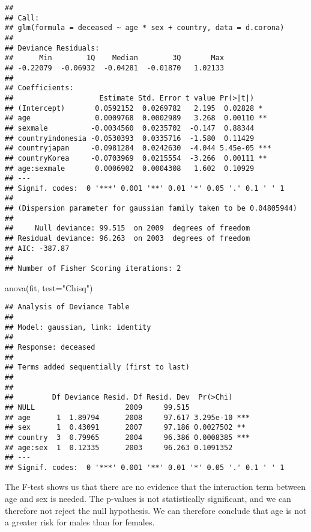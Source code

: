 \documentclass[
]{article}
\newenvironment{Shaded}{\begin{snugshade}}{\end{snugshade}}
\newcommand{\AttributeTok}[1]{\textcolor[rgb]{0.77,0.63,0.00}{#1}}
\newcommand{\FunctionTok}[1]{\textcolor[rgb]{0.00,0.00,0.00}{#1}}
\newcommand{\NormalTok}[1]{#1}
\newcommand{\StringTok}[1]{\textcolor[rgb]{0.31,0.60,0.02}{#1}}
\begin{document}
\begin{verbatim}
## 
## Call:
## glm(formula = deceased ~ age * sex + country, data = d.corona)
## 
## Deviance Residuals: 
##      Min        1Q    Median        3Q       Max  
## -0.22079  -0.06932  -0.04281  -0.01870   1.02133  
## 
## Coefficients:
##                    Estimate Std. Error t value Pr(>|t|)    
## (Intercept)       0.0592152  0.0269782   2.195  0.02828 *  
## age               0.0009768  0.0002989   3.268  0.00110 ** 
## sexmale          -0.0034560  0.0235702  -0.147  0.88344    
## countryindonesia -0.0530393  0.0335716  -1.580  0.11429    
## countryjapan     -0.0981284  0.0242630  -4.044 5.45e-05 ***
## countryKorea     -0.0703969  0.0215554  -3.266  0.00111 ** 
## age:sexmale       0.0006902  0.0004308   1.602  0.10929    
## ---
## Signif. codes:  0 '***' 0.001 '**' 0.01 '*' 0.05 '.' 0.1 ' ' 1
## 
## (Dispersion parameter for gaussian family taken to be 0.04805944)
## 
##     Null deviance: 99.515  on 2009  degrees of freedom
## Residual deviance: 96.263  on 2003  degrees of freedom
## AIC: -387.87
## 
## Number of Fisher Scoring iterations: 2
\end{verbatim}

\begin{Shaded}
\begin{Highlighting}[]
\FunctionTok{anova}\NormalTok{(fit, }\AttributeTok{test=}\StringTok{"Chisq"}\NormalTok{)}
\end{Highlighting}
\end{Shaded}

\begin{verbatim}
## Analysis of Deviance Table
## 
## Model: gaussian, link: identity
## 
## Response: deceased
## 
## Terms added sequentially (first to last)
## 
## 
##         Df Deviance Resid. Df Resid. Dev  Pr(>Chi)    
## NULL                     2009     99.515              
## age      1  1.89794      2008     97.617 3.295e-10 ***
## sex      1  0.43091      2007     97.186 0.0027502 ** 
## country  3  0.79965      2004     96.386 0.0008385 ***
## age:sex  1  0.12335      2003     96.263 0.1091352    
## ---
## Signif. codes:  0 '***' 0.001 '**' 0.01 '*' 0.05 '.' 0.1 ' ' 1
\end{verbatim}

The F-test shows us that there are no evidence that the interaction term
between age and sex is needed. The p-values is not statistically
significant, and we can therefore not reject the null hypothesis. We can
therefore conclude that age is not a greater risk for males than for
females.
\end{document}
